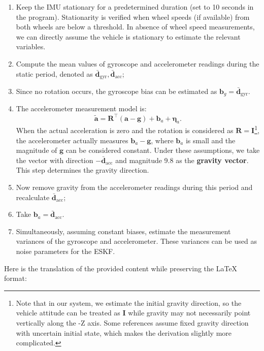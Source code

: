 \begin{enumerate}
\item Keep the IMU stationary for a predetermined duration (set to 10 seconds in the program). Stationarity is verified when wheel speeds (if available) from both wheels are below a threshold. In absence of wheel speed measurements, we can directly assume the vehicle is stationary to estimate the relevant variables.

\item Compute the mean values of gyroscope and accelerometer readings during the static period, denoted as $\bar{\mathbf{d}}_{\mathrm{gyr}}, \bar{\mathbf{d}}_{\mathrm{acc}}$;

\item Since no rotation occurs, the gyroscope bias can be estimated as $\mathbf{b}_{g} = \bar{\mathbf{d}}_{\mathrm{gyr}}$.

\item The accelerometer measurement model is:
\begin{equation}\label{key}
\tilde{\mathbf{a}} = \mathbf{R}^\top (\mathbf{a} - \mathbf{g}) + \mathbf{b}_a + \boldsymbol{\eta}_a.
\end{equation}
When the actual acceleration is zero and the rotation is considered as $\mathbf{R}=\mathbf{I}$\footnote{Note that in our system, we estimate the initial gravity direction, so the vehicle attitude can be treated as $\mathbf{I}$ while gravity may not necessarily point vertically along the -Z axis. Some references assume fixed gravity direction with uncertain initial state, which makes the derivation slightly more complicated.}, the accelerometer actually measures $\mathbf{b}_a - \mathbf{g}$, where $\mathbf{b}_a$ is small and the magnitude of $\mathbf{g}$ can be considered constant. Under these assumptions, we take the vector with direction $-\bar{\mathbf{d}}_{\mathrm{acc}}$ and magnitude 9.8 as the \textbf{gravity vector}. This step determines the gravity direction.

\item Now remove gravity from the accelerometer readings during this period and recalculate $\bar{\mathbf{d}}_{\mathrm{acc}}$;

\item Take $\mathbf{b}_a = \bar{\mathbf{d}}_{\mathrm{acc}}$.

\item Simultaneously, assuming constant biases, estimate the measurement variances of the gyroscope and accelerometer. These variances can be used as noise parameters for the ESKF.
\end{enumerate}
Here is the translation of the provided content while preserving the LaTeX format:

